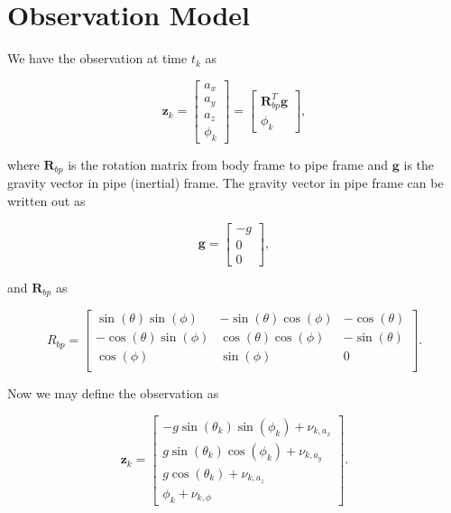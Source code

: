 \documentclass[12pt]{article}
\begin{document}
\section{Observation Model}\label{sec:obs-model}

We have the observation at time $t_k$ as

\begin{equation}
	\mathbf{z}_k = 
		\begin{bmatrix}
			a_x \\
			a_y \\
			a_z \\
			\phi_k 
		\end{bmatrix}
		=
	\begin{bmatrix}
		\mathbf{R}^T_{bp}\mathbf{g} \\
		\phi_k 
	\end{bmatrix},
\end{equation}

where $\mathbf{R}_{bp}$ is the rotation matrix from body frame to pipe frame and $\mathbf{g}$ is the gravity vector in pipe (inertial) frame. The gravity vector in pipe frame can be written out as

\begin{equation}
\mathbf{g} = 
\begin{bmatrix}
-g \\
 0\\
 0
\end{bmatrix},
\end{equation}

and $\mathbf{R}_{bp}$ as

\begin{equation}
 R_{bp} = 
 \begin{bmatrix}
 \sin(\theta)\sin(\phi) & -\sin(\theta)\cos(\phi) & -\cos(\theta) \\
 -\cos(\theta)\sin(\phi)& \cos(\theta)\cos(\phi)  & -\sin(\theta) \\
 \cos(\phi)             & \sin(\phi)              & 0 \\
 \end{bmatrix}.
\end{equation}

Now we may define the observation as

\begin{equation}
	\mathbf{z}_k = 
	\begin{bmatrix}
	-g \sin(\theta_k) \sin(\phi_k) + \nu_{k,a_x} \\
	g \sin(\theta_k) \cos(\phi_k) + \nu_{k,a_y} \\
	g \cos(\theta_k) + \nu_{k,a_z} \\
	\phi_k + \nu_{k,\phi}
	\end{bmatrix}.
\end{equation}
\end{document}
